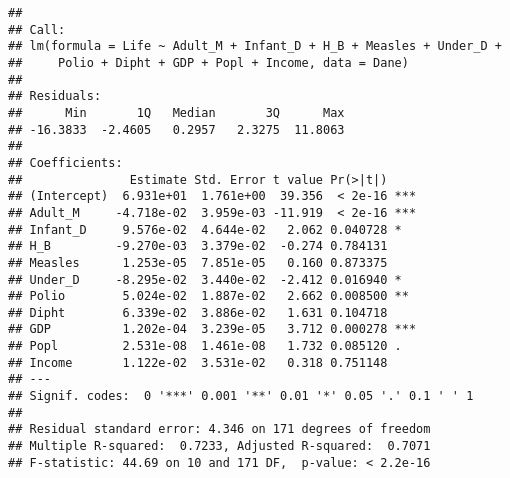\documentclass[
]{article}
\begin{document}
\begin{verbatim}
## 
## Call:
## lm(formula = Life ~ Adult_M + Infant_D + H_B + Measles + Under_D + 
##     Polio + Dipht + GDP + Popl + Income, data = Dane)
## 
## Residuals:
##      Min       1Q   Median       3Q      Max 
## -16.3833  -2.4605   0.2957   2.3275  11.8063 
## 
## Coefficients:
##               Estimate Std. Error t value Pr(>|t|)    
## (Intercept)  6.931e+01  1.761e+00  39.356  < 2e-16 ***
## Adult_M     -4.718e-02  3.959e-03 -11.919  < 2e-16 ***
## Infant_D     9.576e-02  4.644e-02   2.062 0.040728 *  
## H_B         -9.270e-03  3.379e-02  -0.274 0.784131    
## Measles      1.253e-05  7.851e-05   0.160 0.873375    
## Under_D     -8.295e-02  3.440e-02  -2.412 0.016940 *  
## Polio        5.024e-02  1.887e-02   2.662 0.008500 ** 
## Dipht        6.339e-02  3.886e-02   1.631 0.104718    
## GDP          1.202e-04  3.239e-05   3.712 0.000278 ***
## Popl         2.531e-08  1.461e-08   1.732 0.085120 .  
## Income       1.122e-02  3.531e-02   0.318 0.751148    
## ---
## Signif. codes:  0 '***' 0.001 '**' 0.01 '*' 0.05 '.' 0.1 ' ' 1
## 
## Residual standard error: 4.346 on 171 degrees of freedom
## Multiple R-squared:  0.7233, Adjusted R-squared:  0.7071 
## F-statistic: 44.69 on 10 and 171 DF,  p-value: < 2.2e-16
\end{verbatim}
\end{document}
